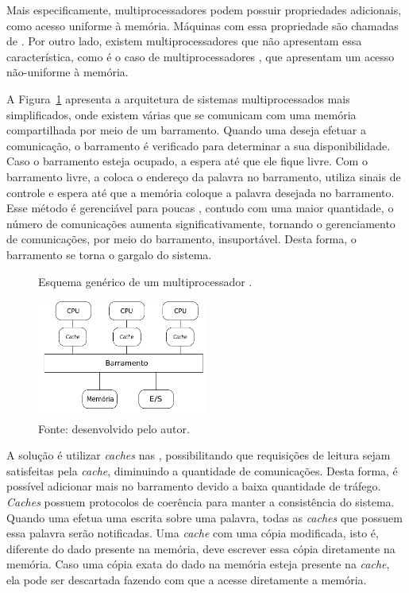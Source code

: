 Mais especificamente, multiprocessadores podem possuir propriedades adicionais,
como acesso uniforme à memória. Máquinas com essa propriedade são chamadas de
\uma. Por outro lado, existem multiprocessadores que não apresentam essa
característica, como é o caso de multiprocessadores \numa, que apresentam um acesso
não-uniforme à memória.

A Figura~\ref{fig:uma} apresenta a arquitetura de sistemas multiprocessados \uma
mais simplificados, onde existem várias \cpus que se
comunicam com uma memória compartilhada por meio de um barramento. Quando uma
\cpu deseja efetuar a comunicação, o barramento é verificado para
determinar a sua disponibilidade. Caso o barramento esteja ocupado, a
\cpu espera até que ele fique livre. Com o barramento livre, a \cpu
coloca o endereço da palavra no barramento, utiliza sinais de
controle e espera até que a memória coloque a palavra desejada no barramento. Esse
método é gerenciável para poucas \cpus, contudo com uma maior quantidade, o
número de comunicações aumenta significativamente, tornando
o gerenciamento de comunicações, por meio do barramento, insuportável. Desta
forma, o barramento se torna o gargalo do sistema.

\begin{figure}[t]
	\centering
    \caption{Esquema genérico de um multiprocessador \uma.}
    \includegraphics[width=0.5\textwidth]{figs/multiproc.pdf}
    \caption*{Fonte: desenvolvido pelo autor.}
    \label{fig:uma}
\end{figure}

A solução é utilizar \textit{caches} nas \cpus, possibilitando que requisições
de leitura sejam satisfeitas pela \textit{cache}, diminuindo a quantidade de
comunicações. Desta forma, é possível adicionar mais \cpus no barramento devido a baixa
quantidade de tráfego. \textit{Caches} possuem protocolos de coerência para
manter a consistência do sistema. Quando uma \cpu
efetua uma escrita sobre uma palavra, todas as \textit{caches} que possuem essa
palavra serão notificadas. Uma \textit{cache} com uma cópia modificada, isto é,
diferente do dado presente na memória, deve escrever essa cópia diretamente na
memória. Caso uma cópia exata do dado na memória esteja presente na
\textit{cache}, ela pode ser descartada fazendo com que a \cpu acesse
diretamente a memória.

